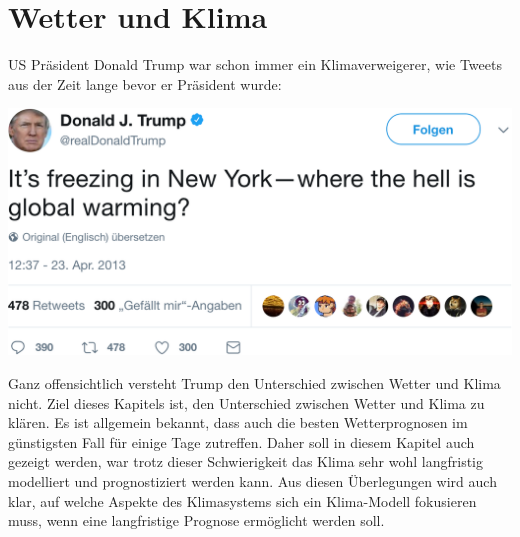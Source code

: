 %
%
%
%
\chapter{Wetter und Klima\label{chapter:wetter und klima}}
US Präsident Donald Trump war schon immer ein Klimaverweigerer, wie Tweets
aus der Zeit lange bevor er Präsident wurde:
\begin{center}
\includegraphics[width=\hsize]{chapters/1/trump.png}
\end{center}
Ganz offensichtlich versteht Trump den Unterschied zwischen Wetter und
Klima nicht.
Ziel dieses Kapitels ist, den Unterschied zwischen Wetter und Klima
zu klären.
Es ist allgemein bekannt, dass auch die besten Wetterprognosen im
günstigsten Fall für einige Tage zutreffen.
Daher soll in diesem Kapitel auch gezeigt werden, war trotz dieser
Schwierigkeit das Klima sehr wohl langfristig modelliert und prognostiziert
werden kann.
Aus diesen Überlegungen wird auch klar, auf welche Aspekte des Klimasystems
sich ein Klima-Modell fokusieren muss, wenn eine langfristige Prognose
ermöglicht werden soll.






